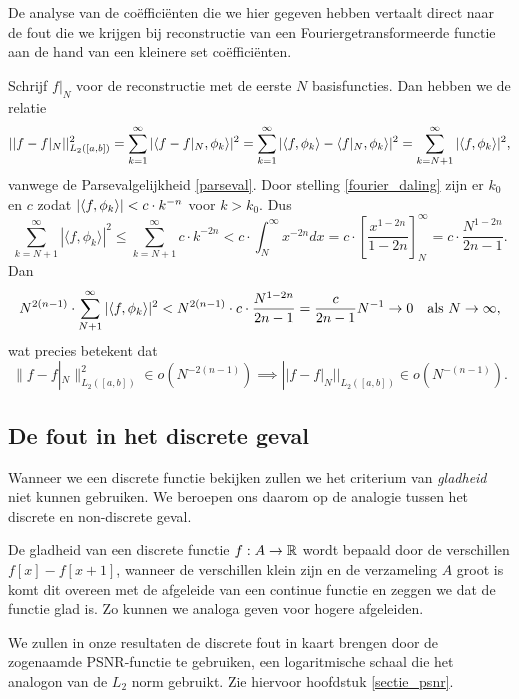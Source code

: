 De analyse van de co\"effici\"enten die we hier gegeven hebben vertaalt direct naar de fout die we krijgen
bij reconstructie van een Fouriergetransformeerde functie aan de hand van een kleinere set co\"effici\"enten.

\begin{gevolg}
Schrijf $f|_{N}$ voor de reconstructie met de eerste $N$ basisfuncties. Dan hebben we de relatie
\[
  || f - f|_N||^2_{L_2([a,b])} = \sum_{k=1}^\infty |\langle f-f|_N , \phi_k \rangle|^2 = \sum_{k=1}^\infty |\langle f , \phi_k \rangle 
  - \langle f|_N , \phi_k \rangle|^2 = \sum_{k=N+1}^\infty |\langle f , \phi_k \rangle|^2,
\]
vanwege de Parsevalgelijkheid \eqref{parseval}. Door stelling \ref{fourier_daling} zijn er $k_0$ en $c$ zodat ${\left| \langle f , \phi_k \rangle \right|} < c\cdot k^{-n}$ voor $k > k_0$. Dus
\[
	\sum_{k=N+1}^\infty | \langle f, \phi_{k} \rangle |^2 \leq \sum_{k=N+1}^\infty c \cdot k^{-2n} < c \cdot \int_{N}^\infty x^{-2n} dx = c \cdot \left[ \frac{x^{1-2n}}{1-2n} \right]^\infty_N = c \cdot \frac{N^{1-2n}}{2n-1}.
\]
Dan
\[
N^{2(n-1)} \cdot \sum_{N+1}^\infty |\langle f , \phi_k \rangle|^2 < N^{2(n-1)} \cdot c \cdot \frac{N^{1-2n}}{2n-1} = \frac{c}{2n-1} N^{-1} \to 0 \quad \text{als } N\to\infty,
\]
wat precies betekent dat
 \[
\|f-f|_{N}\|^2_{L_2([a,b])} \in o\left ( N^{-2(n-1)} \right) 
\implies ||f - f|_{N}||_{L_2([a,b])} \in o\left(N^{-(n-1)}\right).
\]
\end{gevolg}

\subsection{De fout in het discrete geval}
Wanneer we een discrete functie bekijken zullen we het criterium van \emph{gladheid} niet kunnen gebruiken.
We beroepen ons daarom op de analogie tussen het discrete en non-discrete geval.

De gladheid van een discrete functie $f:A\to\mathbb{R}$ wordt bepaald door de verschillen \mbox{$f[x]-f[x+1]$},
wanneer de verschillen klein zijn en de verzameling $A$ groot is komt dit overeen met de afgeleide van een 
continue functie en zeggen we dat de functie glad is. Zo kunnen we analoga geven voor hogere afgeleiden.

We zullen in onze resultaten de discrete fout in kaart brengen door de zogenaamde PSNR-functie te gebruiken,
een logaritmische schaal die het analogon van de $L_2$ norm gebruikt. Zie hiervoor hoofdstuk \ref{sectie_psnr}.

